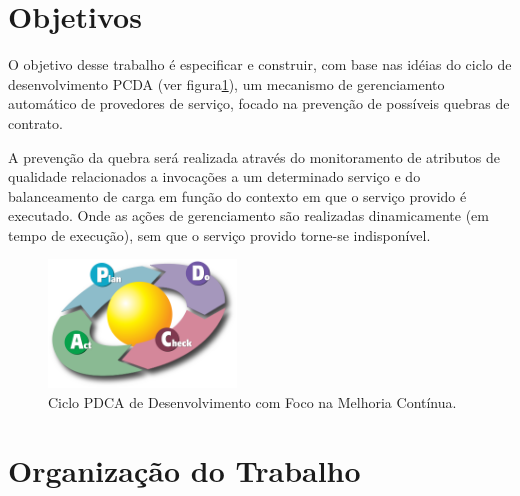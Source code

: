 \newpage
\section{Objetivos}

O objetivo desse trabalho é especificar e construir, com base nas idéias do ciclo de desenvolvimento PCDA (ver figura\ref{fig:pdca}), um mecanismo de gerenciamento automático de provedores de serviço, focado na prevenção de possíveis quebras de contrato.

A prevenção da quebra será realizada através do monitoramento de atributos de qualidade relacionados a invocações a um determinado serviço e do balanceamento de carga em função do contexto em que o serviço provido é executado. Onde as ações de gerenciamento são realizadas dinamicamente (em tempo de execução), sem que o serviço provido torne-se indisponível.

\begin{figure}[htp]
\centering
\includegraphics[width=5cm]{chapters/intro/pdca_cycle.png}
\caption[Ciclo PDCA]{Ciclo PDCA de Desenvolvimento com Foco na Melhoria Contínua.}
\label{fig:pdca}
\end{figure}


\section{Organização do Trabalho}


